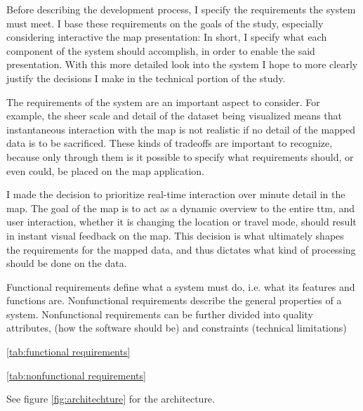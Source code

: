 Before describing the development process,
I specify the requirements the system must meet.
I base these requirements on the goals of the study,
especially considering interactive the map presentation:
In short, I specify what each component of the system should accomplish,
in order to enable the said presentation.
With this more detailed look into the system I hope to
more clearly justify the decisions
I make in the technical portion of the study.

The requirements of the system are an important aspect to consider.
For example, the sheer scale and detail of the dataset being visualized
means that instantaneous interaction with the map is not realistic
if no detail of the mapped data is to be sacrificed.
These kinds of tradeoffs are important to recognize,
because only through them is it possible to specify what
requirements should, or even could, be placed on the map application.

I made the decision to prioritize real-time interaction over minute detail in the map.
The goal of the map is to act as a dynamic overview to the entire \acrshort{ttm},
and user interaction, whether it is changing the location or travel mode,
should result in instant visual feedback on the map.
This decision is what ultimately shapes the requirements for the mapped data,
and thus dictates what kind of processing should be done on the data.

Functional requirements define what a system must do, i.e.
what its features and functions are.
Nonfunctional requirements describe the general properties of a system.
Nonfunctional requirements can be further divided into quality attributes,
(how the software should be) and constraints (technical limitations)

\ref{tab:functional requirements}



\ref{tab:nonfunctional requirements}



See figure \ref{fig:architechture} for the architecture.

